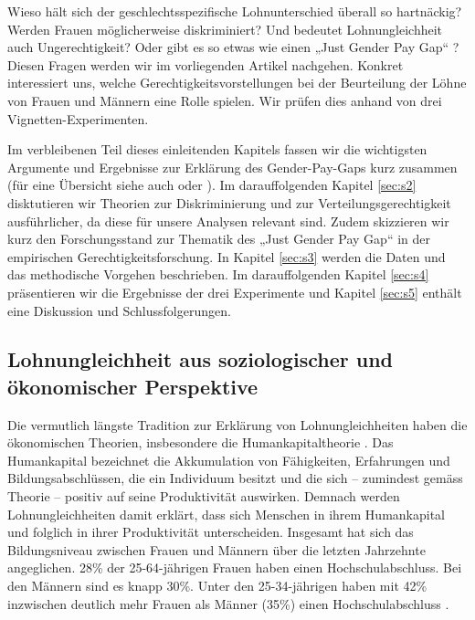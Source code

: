 \documentclass[a4paper,12pt]{article}
\renewcommand{\baselinestretch}{1.1}
\newif\ifcomments
\newcommand{\comment}[1]{%
    \ifcomments\marginpar{\renewcommand{\baselinestretch}{1}\tiny\hspace*{-1.1em}\colorbox{gray!20}%
    {\textcolor{red}{\parbox[t]{.9in}{\raggedright #1}}}}\fi}
\begin{document}
Wieso hält sich der geschlechtsspezifische Lohnunterschied überall so hartnäckig? Werden Frauen möglicherweise diskriminiert? Und bedeutet Lohnungleichheit auch Ungerechtigkeit? Oder gibt es so etwas wie einen „Just Gender Pay Gap“ \citep{Jasso-Webster-1997,Sauer-2014}? Diesen Fragen werden wir im vorliegenden Artikel nachgehen. Konkret interessiert uns, welche Gerechtigkeitsvorstellungen bei der Beurteilung der Löhne von Frauen und Männern eine Rolle spielen. Wir prüfen dies anhand von drei Vignetten-Experimenten.
\comment{noch konkreter?}
Im verbleibenen Teil dieses einleitenden Kapitels fassen wir die wichtigsten Argumente und Ergebnisse zur Erklärung des Gender-Pay-Gaps kurz zusammen (für eine Übersicht siehe auch \citealp{Blau-Kahn-2017} oder \citealp{Weichselbaumer-Winter-Ebmer-2005}). Im darauffolgenden Kapitel \ref{sec:s2} disktutieren wir Theorien zur Diskriminierung und zur Verteilungsgerechtigkeit ausführlicher, da diese für unsere Analysen relevant sind. Zudem skizzieren wir kurz den Forschungsstand zur Thematik des „Just Gender Pay Gap“ in der empirischen Gerechtigkeitsforschung. In Kapitel \ref{sec:s3} werden die Daten und das methodische Vorgehen beschrieben. Im darauffolgenden Kapitel \ref{sec:s4} präsentieren wir die Ergebnisse der drei Experimente und Kapitel \ref{sec:s5} enthält eine Diskussion und Schlussfolgerungen.

\subsection{Lohnungleichheit aus soziologischer und ökonomischer Perspektive}
\comment{Bei den englischen Begriffen auf Gross-Kleinschreibung achten}

Die vermutlich längste Tradition zur Erklärung von Lohnungleichheiten haben die
ökonomischen Theorien, insbesondere die Humankapitaltheorie \citep{Becker-1975,
Mincer-1958,Mincer-Polachek-1974}. Das Humankapital bezeichnet die Akkumulation
von Fähigkeiten, Erfahrungen und Bildungsabschlüssen, die ein Individuum
besitzt und die sich -- zumindest gemäss Theorie -- positiv auf seine
Produktivität auswirken. Demnach werden Lohnungleichheiten damit erklärt, dass
sich Menschen in ihrem Humankapital und folglich in ihrer Produktivität
unterscheiden. 
Insgesamt hat sich das Bildungsniveau zwischen Frauen und Männern über die letzten Jahrzehnte angeglichen. 28\% der 25-64-jährigen Frauen haben einen Hochschulabschluss. Bei den Männern sind es knapp 30\%. Unter den 25-34-jährigen haben mit 42\% inzwischen deutlich mehr Frauen als Männer (35\%) einen Hochschulabschluss \citep{BFS-2019b}. 
\end{document}
